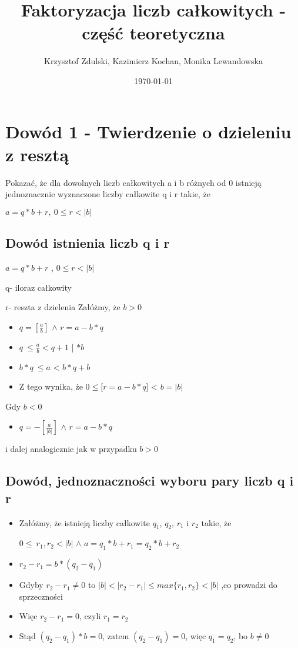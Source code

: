 \documentclass[a4paper, 12pt]{article}
\begin{document}
\title{ Faktoryzacja liczb całkowitych - część teoretyczna}
    \author{Krzysztof Zdulski, Kazimierz Kochan, Monika Lewandowska}
    \date{\today}
    \maketitle
    
\tableofcontents
\newpage

\section{Dowód 1 - Twierdzenie o dzieleniu z resztą}

Pokazać, że dla dowolnych liczb całkowitych a i b różnych od 0 istnieją jednoznacznie wyznaczone liczby całkowite q i r takie, że  

\(a=q*b+r,\ 0 \leq r<|b|\)

\subsection {Dowód istnienia liczb q i r}
\(a=q*b+r\) , \(0 \leq r<|b|\)

q- iloraz całkowity

r- reszta z dzielenia
\bigbreak
Załóżmy, że \(b>0\)
\begin{itemize}
	\item \(q=[\frac{a}{b}]\) \(\wedge \) \(r=a-b*q\)
	\item \(q\ \leq \frac{a}{b} < q+1\) | \(* b\)
	\item \(b*q\ \leq a \) < \(b*q +b \)
	\item Z tego wynika, że \(0 \leq [ r=a - b*q\)] < \( b=|b|\)
\end{itemize}
\bigbreak
Gdy \(b<0\)

\begin{itemize}
	\item \(q= - [\frac{a}{|b|}]\) \(\wedge \) \(r=a-b*q\)
\end{itemize}
i dalej analogicznie jak w przypadku \(b>0\) 

\subsection{Dowód, jednoznaczności wyboru pary liczb q i r}
\begin{itemize}

\item Załóżmy, że istnieją liczby całkowite \(q_{1}\), \(q_{2}\), \(r_{1}\) i \(r_{2}\) takie, że

 \(0 \leq\ r_{1}, r_{2}<|b|\) \(\wedge \) \(a= q_{1}*b + r_{1} = q_{2}*b + r_{2}\)
\item \(r_{2}-r_{1} = b*(q_{2}-q_{1})\)
\item Gdyby \(r_{2} - r_{1} \neq 0\) to \( |b|<|r_{2} - r_{1}|\leq max\{r_{1},r_{2}\}< |b|\)
,co prowadzi do sprzeczności

\item Więc \(r_{2}-r_{1}=0\), czyli \(r_{1}=r_{2}\) 

\item Stąd \((q_{2}-q_{1})*b=0\), zatem \((q_{2}-q_{1})=0\), więc \(q_{1}=q_{2}\), bo \(b \neq 0\)
\end{itemize}
\end{document}
